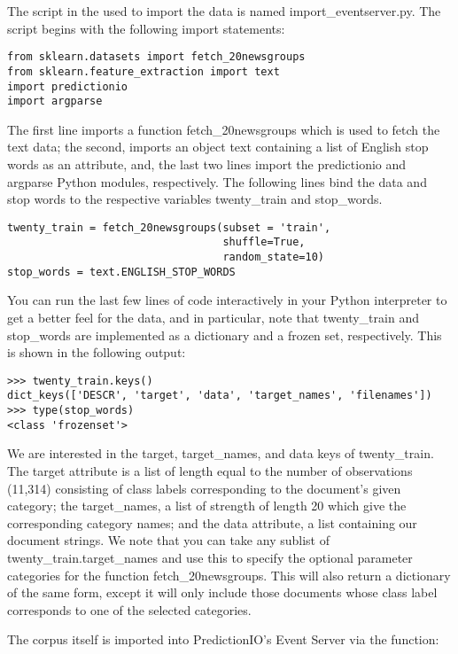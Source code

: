 \documentclass[a4paper,12pt]{article}
\newcommand{\3}{\left}
\newcommand{\4}{\right}
\renewcommand{\-}[1]{{}^{-#1}}
\begin{document}
The script in the  used to import the data is named import\_eventserver.py. The script begins with the following import statements:

\begin{verbatim}
from sklearn.datasets import fetch_20newsgroups
from sklearn.feature_extraction import text 
import predictionio
import argparse
\end{verbatim}

The first line imports a function fetch\_20newsgroups which is used to fetch the text data; the second, imports an object text containing a list of English stop words as an attribute, and, the last two lines import the predictionio and argparse Python modules, respectively. The following lines bind the data and stop words to the respective variables twenty\_train and stop\_words.

\begin{verbatim}
twenty_train = fetch_20newsgroups(subset = 'train',
                                  shuffle=True,
                                  random_state=10)
stop_words = text.ENGLISH_STOP_WORDS
\end{verbatim}

You can run the last few lines of code interactively in your Python interpreter to get a better feel for the data, and in particular, note that twenty\_train and stop\_words are implemented as a dictionary and a frozen set, respectively. This is shown in the following output:

\begin{verbatim}
>>> twenty_train.keys()
dict_keys(['DESCR', 'target', 'data', 'target_names', 'filenames'])
>>> type(stop_words)
<class 'frozenset'>
\end{verbatim}

We are interested in the target, target\_names, and data keys of twenty\_train. The target attribute is a list of length equal to the number of observations (11,314) consisting of class labels corresponding to the document's given category; the target\_names, a list of strength of length 20 which give the corresponding category names; and the data attribute, a list containing our document strings. We note that you can take any sublist of twenty\_train.target\_names and use this to specify the optional parameter categories for the function fetch\_20newsgroups. This will also return a dictionary of the same form, except it will only include those documents whose class label corresponds to one of the selected categories.

The corpus itself is imported into PredictionIO's Event Server via the function:
\end{document}
